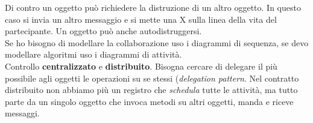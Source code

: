 Di contro un oggetto può richiedere la distruzione di un altro oggetto. In questo caso si invia un altro messaggio e si mette una X sulla linea della vita del partecipante. Un oggetto può anche autodistruggersi.\\

Se ho bisogno di modellare la collaborazione uso i diagrammi di sequenza, se devo modellare algoritmi uso i diagrammi di attività.\\
Controllo \textbf{centralizzato} e \textbf{distribuito}. Bisogna cercare di delegare il più possibile agli oggetti le operazioni su se stessi (\textit{delegation pattern}. Nel contratto distribuito non abbiamo più un registro che \textit{schedula} tutte le attività, ma tutto parte da un singolo oggetto che invoca metodi su altri oggetti, manda e riceve messaggi.\\


